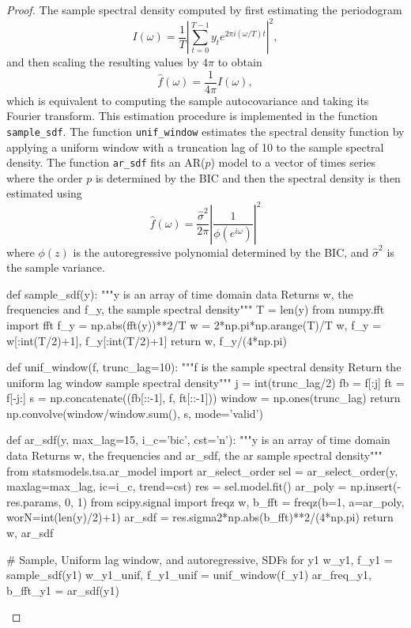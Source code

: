 \documentclass[oneside,reqno]{amsart}
\theoremstyle{definition}
\begin{document}
\begin{proof}
The sample spectral density computed by first estimating the periodogram 
\[
	I(\omega) = \frac{1}{T} \left| \sum_{t=0}^{T-1} y_t e^{2\pi i (\omega/T)t} \right|^2,
\]
and then scaling the resulting values by $4\pi$ to obtain
\[
	\hat f(\omega) =  \frac{1}{4\pi} I(\omega),
\]
which is equivalent to computing the sample autocovariance and taking its Fourier transform. This estimation procedure is implemented in the function \texttt{sample_sdf}. The function \texttt{unif_window} estimates the spectral density function by applying a uniform window with a truncation lag of 10 to the sample spectral density.  The function \texttt{ar_sdf} fits an AR($p$) model to a vector of times series where the order $p$ is determined by the BIC and then the spectral density is then estimated using 
\[
	\hat f(\omega) = \frac{\hat\sigma^2}{2\pi} \left| \frac{1}{\phi(e^{i\omega})} \right|^2 
\]
where $\phi(z)$ is the autoregressive polynomial determined by the BIC, and $\hat \sigma^2$ is the sample variance.  

\begin{python3code}
def sample_sdf(y):
    """y is an array of time domain data 
    Returns w, the frequencies and f_y, the sample spectral density"""
    T = len(y)
    from numpy.fft import fft
    f_y = np.abs(fft(y))**2/T
    w = 2*np.pi*np.arange(T)/T
    w, f_y = w[:int(T/2)+1], f_y[:int(T/2)+1]
    return w, f_y/(4*np.pi)

def unif_window(f, trunc_lag=10):
    """f is the sample spectral density
    Return the uniform lag window sample spectral density"""
    j = int(trunc_lag/2)
    fb = f[:j]
    ft = f[-j:]
    s = np.concatenate((fb[::-1], f, ft[::-1]))
    window = np.ones(trunc_lag)
    return np.convolve(window/window.sum(), s, mode='valid')

def ar_sdf(y, max_lag=15, i_c='bic', cst='n'):
    """y is an array of time domain data 
    Returns w, the frequencies and ar_sdf, the ar sample spectral density"""
    from statsmodels.tsa.ar_model import ar_select_order
    sel = ar_select_order(y, maxlag=max_lag, ic=i_c, trend=cst)
    res = sel.model.fit()
    ar_poly = np.insert(-res.params, 0, 1)
    from scipy.signal import freqz
    w, b_fft = freqz(b=1, a=ar_poly, worN=int(len(y)/2)+1)
    ar_sdf = res.sigma2*np.abs(b_fft)**2/(4*np.pi)
    return w, ar_sdf

# Sample, Uniform lag window, and  autoregressive, SDFs for y1
w_y1, f_y1 = sample_sdf(y1)
w_y1_unif, f_y1_unif = unif_window(f_y1)
ar_freq_y1, b_fft_y1 = ar_sdf(y1)


\end{python3code}
\end{proof}
\end{document}
